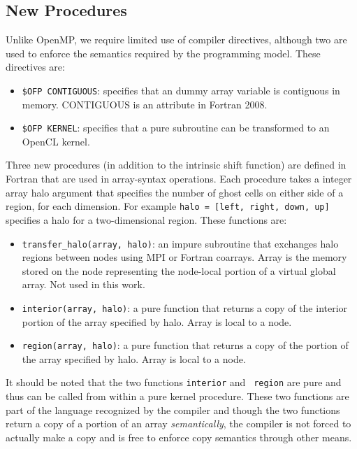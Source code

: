 \subsection{New Procedures}

Unlike OpenMP, we require limited use of compiler directives, although
two are used to enforce the semantics required by the programming
model.  These directives are:

\begin{itemize}

\item {\tt \!\$OFP CONTIGUOUS}: specifies that an dummy array variable is
  contiguous in memory. CONTIGUOUS is an attribute in Fortran 2008.

\item {\tt \!\$OFP KERNEL}: specifies that a pure subroutine can be
  transformed to an OpenCL kernel.

\end{itemize}

Three new procedures (in addition to the intrinsic shift function) are
defined in Fortran that are used in array-syntax operations.  Each
procedure takes a integer array halo argument that specifies the
number of ghost cells on either side of a region, for each dimension.
For example {\tt halo = [left, right, down, up]} specifies a halo for
a two-dimensional region.  These functions are:

\begin{itemize}

\item {\tt transfer\_halo(array, halo)}: an impure subroutine that
  exchanges halo regions between nodes using MPI or Fortran
  coarrays. Array is the memory stored on the node representing the
  node-local portion of a virtual global array. Not used in this work.

\item {\tt interior(array, halo)}: a pure function that returns a copy of
  the interior portion of the array specified by halo. Array is
  local to a node.

\item {\tt region(array, halo)}: a pure function that returns a copy of
  the portion of the array specified by halo.  Array is local to a node.

\end{itemize}

It should be noted that the two functions {\tt interior} and {\tt
  region} are pure and thus can be called from within a pure kernel
procedure.  These two functions are part of the language recognized by
the compiler and though the two functions return a copy of a portion
of an array \emph{semantically}, the compiler is not forced to
actually make a copy and is free to enforce copy semantics through
other means.


